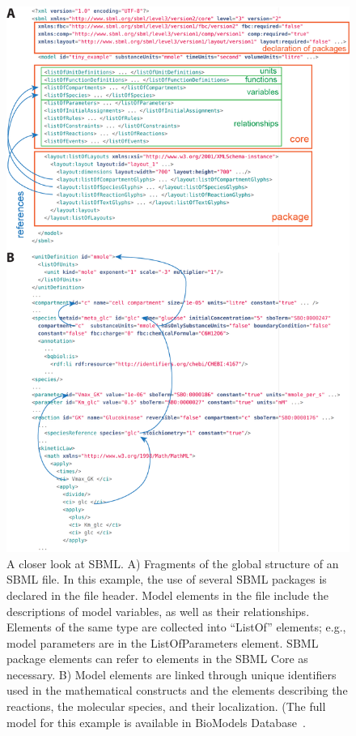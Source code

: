 \documentclass[]{draft-sbml-paper}
\begin{document}
\begin{figure}[htb]
   \center
   \includegraphics[width=.8\textwidth]{res/SBML_XML_example_v03.png}
 \caption{A closer look at SBML. A) Fragments of the global structure of an SBML file. In this example, the use of several SBML packages is declared in the file header. Model elements in the file include the descriptions of model variables, as well as their relationships.  Elements of the same type are collected into ``ListOf'' elements; e.g., model parameters are in the ListOfParameters element. SBML package elements can refer to elements in the SBML Core as necessary. B) Model elements are linked through unique identifiers used in the mathematical constructs and the elements describing the reactions, the molecular species, and their localization. (The full model for this example is available in BioModels Database~\citep{chelliah2014biomodels, li2010biomodels}.}
\label{fig:examples-sbml}
\end{figure}


\clearpage
\newpage
\end{document}
